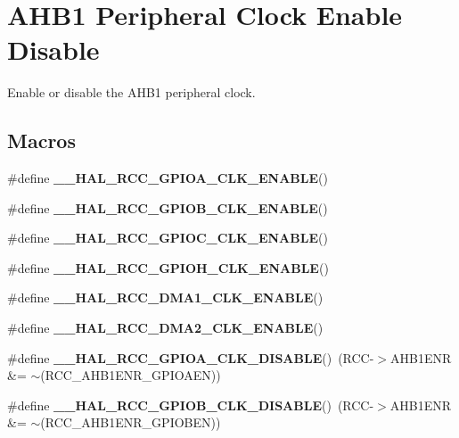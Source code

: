 \hypertarget{group___r_c_c___a_h_b1___clock___enable___disable}{}\section{A\+H\+B1 Peripheral Clock Enable Disable}
\label{group___r_c_c___a_h_b1___clock___enable___disable}


Enable or disable the A\+H\+B1 peripheral clock.  


\subsection*{Macros}
\begin{DoxyCompactItemize}
\item 
\#define {\bfseries \+\_\+\+\_\+\+H\+A\+L\+\_\+\+R\+C\+C\+\_\+\+G\+P\+I\+O\+A\+\_\+\+C\+L\+K\+\_\+\+E\+N\+A\+B\+LE}()
\item 
\#define {\bfseries \+\_\+\+\_\+\+H\+A\+L\+\_\+\+R\+C\+C\+\_\+\+G\+P\+I\+O\+B\+\_\+\+C\+L\+K\+\_\+\+E\+N\+A\+B\+LE}()
\item 
\#define {\bfseries \+\_\+\+\_\+\+H\+A\+L\+\_\+\+R\+C\+C\+\_\+\+G\+P\+I\+O\+C\+\_\+\+C\+L\+K\+\_\+\+E\+N\+A\+B\+LE}()
\item 
\#define {\bfseries \+\_\+\+\_\+\+H\+A\+L\+\_\+\+R\+C\+C\+\_\+\+G\+P\+I\+O\+H\+\_\+\+C\+L\+K\+\_\+\+E\+N\+A\+B\+LE}()
\item 
\#define {\bfseries \+\_\+\+\_\+\+H\+A\+L\+\_\+\+R\+C\+C\+\_\+\+D\+M\+A1\+\_\+\+C\+L\+K\+\_\+\+E\+N\+A\+B\+LE}()
\item 
\#define {\bfseries \+\_\+\+\_\+\+H\+A\+L\+\_\+\+R\+C\+C\+\_\+\+D\+M\+A2\+\_\+\+C\+L\+K\+\_\+\+E\+N\+A\+B\+LE}()
\item 
\#define {\bfseries \+\_\+\+\_\+\+H\+A\+L\+\_\+\+R\+C\+C\+\_\+\+G\+P\+I\+O\+A\+\_\+\+C\+L\+K\+\_\+\+D\+I\+S\+A\+B\+LE}()~(R\+CC-\/$>$A\+H\+B1\+E\+NR \&= $\sim$(R\+C\+C\+\_\+\+A\+H\+B1\+E\+N\+R\+\_\+\+G\+P\+I\+O\+A\+EN))\hypertarget{group___r_c_c___a_h_b1___clock___enable___disable_ga7083e491e6a1e165d064d199304bd2f0}{}\label{group___r_c_c___a_h_b1___clock___enable___disable_ga7083e491e6a1e165d064d199304bd2f0}

\item 
\#define {\bfseries \+\_\+\+\_\+\+H\+A\+L\+\_\+\+R\+C\+C\+\_\+\+G\+P\+I\+O\+B\+\_\+\+C\+L\+K\+\_\+\+D\+I\+S\+A\+B\+LE}()~(R\+CC-\/$>$A\+H\+B1\+E\+NR \&= $\sim$(R\+C\+C\+\_\+\+A\+H\+B1\+E\+N\+R\+\_\+\+G\+P\+I\+O\+B\+EN))\hypertarget{group___r_c_c___a_h_b1___clock___enable___disable_ga60be1be419b57dafbbb93df67d68a424}{}\label{group___r_c_c___a_h_b1___clock___enable___disable_ga60be1be419b57dafbbb93df67d68a424}


\end{DoxyCompactItemize}
